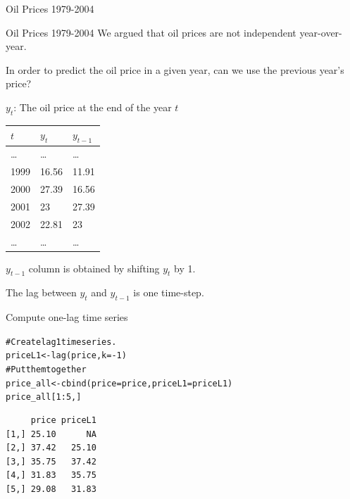 \documentclass{beamer}\usepackage[]{graphicx}\usepackage[]{color}
\makeatletter
\newcommand{\hlnum}[1]{\textcolor[rgb]{0.824,0.412,0.118}{#1}}%
\newcommand{\hlcom}[1]{\textcolor[rgb]{0.824,0.706,0.549}{#1}}%
\newcommand{\hlopt}[1]{\textcolor[rgb]{1,0.894,0.769}{#1}}%
\newcommand{\hlstd}[1]{\textcolor[rgb]{1,0.894,0.769}{#1}}%
\newcommand{\hlkwb}[1]{\textcolor[rgb]{0.804,0.776,0.451}{#1}}%
\newcommand{\hlkwc}[1]{\textcolor[rgb]{0.78,0.941,0.545}{#1}}%
\newcommand{\hlkwd}[1]{\textcolor[rgb]{1,0.78,0.769}{#1}}%
\newenvironment{kframe}{%
 \def\at@end@of@kframe{}%
 \ifinner\ifhmode%
  \def\at@end@of@kframe{\end{minipage}}%
  \begin{minipage}{\columnwidth}%
 \fi\fi%
 \def\FrameCommand##1{\hskip\@totalleftmargin \hskip-\fboxsep
 \colorbox{shadecolor}{##1}\hskip-\fboxsep
     \hskip-\linewidth \hskip-\@totalleftmargin \hskip\columnwidth}%
 \MakeFramed {\advance\hsize-\width
   \@totalleftmargin\z@ \linewidth\hsize
   \@setminipage}}%
 {\par\unskip\endMakeFramed%
 \at@end@of@kframe}
\newenvironment{knitrout}{}{} %
\makeatother
\begin{document}
\begin{darkframes}
\begin{frame}[fragile]{Oil Prices 1979-2004}
\begin{knitrout}
\end{knitrout}
    \end{frame}
  
    
    
    \begin{frame}[fragile]{Oil Prices 1979-2004}
     \fontsize{9}{9}\selectfont
      We argued that oil prices are not independent year-over-year. \pause
      
      In order to predict the oil price in a given year, can we use the previous year's price? \pause
      \bigskip
      
      \begin{center}
      $y_t$: The oil price at the end of the year $t$ \pause
      \end{center}
      \bigskip
      
      \begin{center}
          \begin{tabular}{lll}
          \hline
            $t$ & $y_t$ &  $y_{t-1}$\\
          \hline
          \ldots & \ldots & \ldots \\
          1999	& 16.56 & 11.91 \\
          2000 &	27.39 & 16.56  \\
          2001	& 23 & 27.39 \\
          2002	& 22.81 & 23 \\
          \ldots & \ldots & \ldots \\
          \hline 
        \end{tabular}
      \end{center}
      \pause
      
      $y_{t-1}$ column is obtained by shifting $y_t$ by 1. \pause
      
      The \alert{lag} between $y_t$ and $y_{t-1}$ is one time-step.
    
    \end{frame}
    
    
    \begin{frame}[fragile]{Compute one-lag time series}
     \fontsize{8}{8}\selectfont
\begin{knitrout}
\begin{kframe}
\begin{alltt}
\hlcom{# Create lag 1 time series.}
\hlstd{priceL1} \hlkwb{<-} \hlkwd{lag}\hlstd{(price,} \hlkwc{k}\hlstd{=}\hlopt{-}\hlnum{1}\hlstd{)}
\hlcom{# Put them together}
\hlstd{price_all} \hlkwb{<-} \hlkwd{cbind}\hlstd{(}\hlkwc{price}\hlstd{=price,} \hlkwc{priceL1}\hlstd{=priceL1)}
\hlstd{price_all[}\hlnum{1}\hlopt{:}\hlnum{5}\hlstd{,]}
\end{alltt}
\begin{verbatim}
     price priceL1
[1,] 25.10      NA
[2,] 37.42   25.10
[3,] 35.75   37.42
[4,] 31.83   35.75
[5,] 29.08   31.83
\end{verbatim}
\end{kframe}
\end{knitrout}
      \pause
      \bigskip
      

\end{frame}
\end{darkframes}
\end{document}
